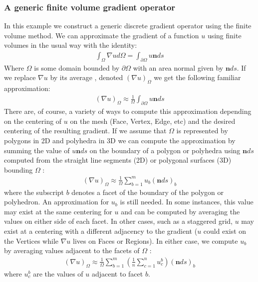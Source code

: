 \subsubsection{A generic finite volume gradient operator}
In this example we construct a generic discrete gradient operator
using the finite volume method.  We can approximate the gradient of a
function $u$ using finite volumes in the usual way with the identity:
\begin{eqnarray}
\int_{\Omega}\nabla u d\Omega = \int_{\partial\Omega}u\mathbf{n}ds
\end{eqnarray}
Where $\Omega$ is some domain bounded by $\partial\Omega$ with an area
normal given by $\mathbf{n}ds$.  If we replace $\nabla u$ by its
average , denoted $(\nabla u)_\Omega$ we get the following familiar
approximation:
\begin{eqnarray}
(\nabla u)_\Omega \approx \frac{1}{\Omega}\int_{\partial\Omega}u\mathbf{n}ds
\end{eqnarray}\label{eqn:fvapprox}
There are, of course, a variety of ways to compute this approximation depending
on the centering of $u$ on the mesh (Face, Vertex, Edge, etc) and the desired
centering of the resulting gradient.  If we assume that $\Omega$ is represented
by polygons in 2D and polyhedra in 3D we can compute the approximation by summing
the value of $u\mathbf{n}ds$ on the boundary of a polygon or polyhedra using
$\mathbf{n}ds$ computed from the straight line segments (2D) or polygonal surfaces (3D)
bounding $\Omega$ :
\begin{eqnarray}
(\nabla u)_\Omega \approx \frac{1}{\Omega}\sum_{b=1}^{m}u_b (\mathbf{n}ds)_b
\end{eqnarray}
where the subscript $b$ denotes a facet of the boundary of the polygon or polyhedron.
An approximation for $u_b$ is still needed.  In some instances, this value may exist
at the same centering for $u$ and can be computed by averaging the values on either 
side of each facet.  In other cases, such as a staggered grid, $u$ may exist at a 
centering with a different adjacency to the gradient ($u$ could exist on the Vertices while
$\nabla u$ lives on Faces or Regions).  In either case, we compute $u_b$ by averaging
values adjacent to the facets of $\Omega$ :
\begin{eqnarray}
(\nabla u)_\Omega \approx \frac{1}{\Omega}\sum_{b=1}^{m} (\frac{1}{n}\sum_{c=1}^n u_c^b) (\mathbf{n}ds)_b
\end{eqnarray}
where $u_c^b$ are the values of $u$ adjacent to facet $b$.

